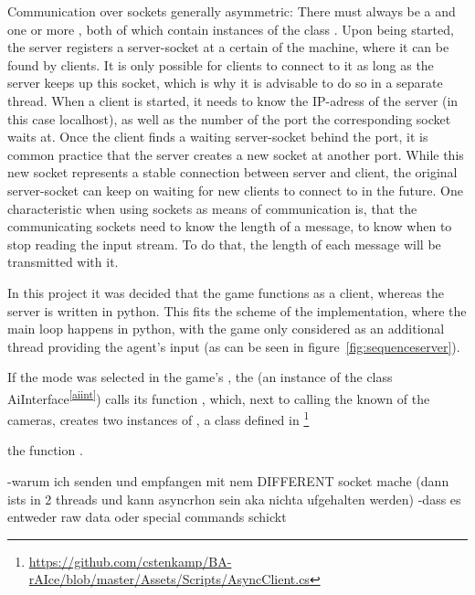 Communication over sockets generally asymmetric: There must always be a  and one or more , both of which contain instances of the class . Upon being started, the server registers a server-socket at a certain  of the machine, where it can be found by clients. It is only possible for clients to connect to it as long as the server keeps up this socket, which is why it is advisable to do so in a separate thread. When a client is started, it needs to know the IP-adress of the server (in this case localhost), as well as the number of the port the corresponding socket waits at. Once the client finds a waiting server-socket behind the port, it is common practice that the server creates a new socket at another port. While this new socket represents a stable connection between server and client, the original server-socket can keep on waiting for new clients to connect to in the future. One characteristic when using sockets as means of communication is, that the communicating sockets need to know the length of a message, to know when to stop reading the input stream. To do that, the length of each message will be transmitted with it.

In this project it was decided that the game functions as a client, whereas the server is written in python. This fits the scheme of the implementation, where the main loop happens in python, with the game only considered as an additional thread providing the agent's input (as can be seen in figure~\ref{fig:sequenceserver}).

If the  mode was selected in the game's , the  (an instance of the class AiInterface\textsuperscript{\ref{aiint}}) calls 
its function , which, next to calling the known  of the cameras, creates two instances of , a class defined in \footnote{\url{https://github.com/cstenkamp/BA-rAIce/blob/master/Assets/Scripts/AsyncClient.cs}}

the function .



-warum ich senden und empfangen mit nem DIFFERENT socket mache (dann ists in 2 threads und kann asyncrhon sein aka nichta ufgehalten werden)
-dass es entweder raw data oder special commands schickt

